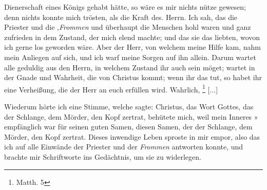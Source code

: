 Dienerschaft eines Königs gehabt hätte, so wäre es mir nichts
nütze gewesen; denn nichts konnte mich trösten, als die Kraft
des. Herrn. Ich sah, das die Priester und die ,\textit{Frommen}
und überhaupt die Menschen hohl waren und ganz zufrieden
in dem Zustand, der mich elend machte; und das sie das
liebten, wovon ich gerne los geworden wäre. Aber der Herr,
von welchem meine Hilfe kam, nahm mein Anliegen auf sich, und
ich warf meine Sorgen auf ihn allein. Darum wartet alle 
geduldig aus den Herrn, in welchem Zustand ihr auch sein möget;
wartet in der Gnade und Wahrheit, die von Christus kommt;
wenn ihr das tut, so habet ihr eine Verheißung, die der Herr
an euch erfüllen wird. Wahrlich, \footnote{Matth. 5} [...]

Wiederum hörte ich eine Stimme, welche sagte:  Christus, das Wort Gottes, das der Schlange,
dem Mörder, den Kopf zertrat, behütete mich, weil mein Inneres »
empfänglich war für seinen guten Samen, diesen Samen, der der
Schlange, dem Mörder, den Kopf zertrat. Dieses inwendige
Leben sproste in mir empor, also das ich auf alle Einwände der
Priester und der \textit{Frommen} antworten konnte, und brachte mir
Schriftworte ins Gedächtnis, um sie zu widerlegen.


